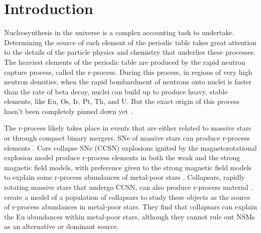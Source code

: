 \documentclass[fleqn,usenatbib]{mnras}
\begin{document}
\section{Introduction}

Nucleosynthesis in the universe is a complex accounting task to undertake. Determining the source of each element of the periodic table takes great attention to the details of the particle physics and chemistry that underlies these processes. The heaviest elements of the periodic table are produced by the rapid neutron capture process, called the r-process. During this process, in regions of very high neutron densities, when the rapid bombardment of neutrons onto nuclei is faster than the rate of beta decay, nuclei can build up to produce heavy, stable elements, like Eu, Os, Ir, Pt, Th, and U. But the exact origin of this process hasn't been completely pinned down yet \citep{Kajino19, Cowan21}. 

The r-process likely takes place in events that are either related to massive stars or through compact binary mergers. SNe of massive stars can produce r-process elements \citep[see][for a discussion on different sources]{Cowan21}. Core collapse SNe (CCSN) explosions ignited by the magnetorotational explosion model produce r-process elements in both the weak and the strong magnetic field models, with preference given to the strong magnetic field models to explain some r-process abundances of metal-poor stars \citep{Nishimura15}. Collapsars, rapidly rotating massive stars that undergo CCSN, can also produce r-process material \citep{Barnes22}. \citet{Brauer21} create a model of a population of collapsars to study these objects as the source of r-process abundances in metal-poor stars. They find that collapsars can explain the Eu abundances within metal-poor stars, although they cannot rule out NSMs as an alternative or dominant source.
\end{document}
